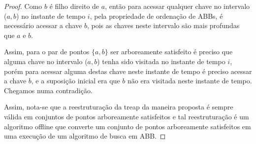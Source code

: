 \begin{proof}
Como $b$ é filho direito de $a$, então para acessar qualquer chave no intervalo ($a,b$) no instante de tempo $i$, pela propriedade de ordenação de ABBs, é necessário acessar a chave $b$, pois as chaves neste intervalo são mais profundas que $a$ e $b$. 

Assim, para o par de pontos $\{a,b\}$ ser arboreamente satisfeito é preciso que alguma chave no intervalo ($a,b$) tenha sido visitada no instante de tempo $i$, porém para acessar alguma destas chave neste instante de tempo é preciso acessar a chave $b$, e a suposição inicial era que $b$ não era visitada neste instante de tempo. Chegamos numa contradição.

Assim, nota-se que a reestruturação da treap da maneira proposta é sempre válida em conjuntos de pontos arboreamente satisfeitos e tal reestruturação é um algoritmo offline que converte um conjunto de pontos arboreamente satisfeitos em uma execução de um algoritmo de busca em ABB.
\end{proof}


